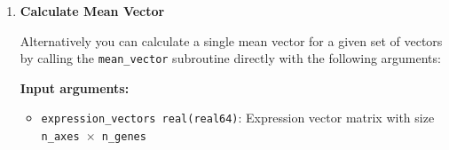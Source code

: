 \begin{enumerate}
        \textbf{Arguments:}
        \begin{itemize}
            \item \texttt{d integer(int32)}: Expression vector dimension
            \item \texttt{n\_genes integer(int32)}: Total number of genes
            \item \texttt{n\_families integer(int32)}: Total number of families
            \item \texttt{expression\_vectors real(real64)}: Gene expression matrix [d × n\_genes]
            \item \texttt{family\_centroids real(real64)}: Family centroid matrix [d × n\_families]
            \item \texttt{gene\_to\_centroid integer(int32)}: Mapping from genes to family centroids [n\_genes]
            \item \texttt{shift\_vectors real(real64)}: Output matrix [2*d × n\_genes] storing centroids (rows 1-d) and shift vectors (rows d+1-2d)
            \item \texttt{ierr integer(int32)}: Error code
        \end{itemize}
        \begin{lstlisting}[language=Fortran, caption={Shift Vector Field Computation}]
call compute_shift_vector_field(d, n_genes, n_families, &
                    expression_vectors, family_centroids, &
                    gene_to_centroid, shift_vectors, ierr)
        \end{lstlisting}


        \textbf{Output Structure:}
        \begin{itemize}
            \item \texttt{shift\_vectors(1:d, :)}: Contains the family centroids for each gene
            \item \texttt{shift\_vectors(d+1:2*d, :)}: Contains the shift vectors (expression vector - family centroid)
        \end{itemize}
          
    \item \textbf{Calculate Mean Vector}
          
          Alternatively you can calculate a single mean vector for a given set of
          vectors by calling the \texttt{mean\_vector} subroutine directly with
          the following arguments:
          
          \textbf{Input arguments:}
          \begin{itemize}
            \item \texttt{expression\_vectors real(real64)}: Expression vector matrix
                  with size \texttt{n\_axes $\times$ n\_genes}
                  

\end{itemize}
\end{enumerate}
